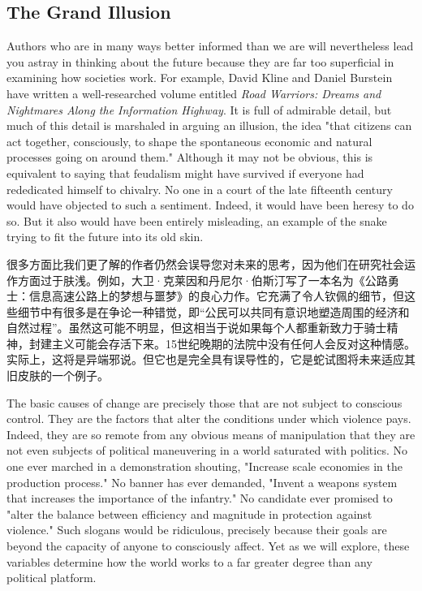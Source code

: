 \subsection{The Grand Illusion}
\begin{paracol}{2}  
Authors who are in many ways better informed than we are will nevertheless lead you astray in thinking about the future because they are far too superficial in examining how societies work. For example, David Kline and Daniel Burstein have written a well-researched volume entitled \emph{Road Warriors: Dreams and Nightmares Along the Information Highway}. It is full of admirable detail, but much of this detail is marshaled in arguing an illusion, the idea "that citizens can act together, consciously, to shape the spontaneous economic and natural processes going on around them." Although it may not be obvious, this is equivalent to saying that feudalism might have survived if everyone had rededicated himself to chivalry. No one in a court of the late fifteenth century would have objected to such a sentiment. Indeed, it would have been heresy to do so. But it also would have been entirely misleading, an example of the snake trying to fit the future into its old skin.

\switchcolumn
很多方面比我们更了解的作者仍然会误导您对未来的思考，因为他们在研究社会运作方面过于肤浅。例如，大卫·克莱因和丹尼尔·伯斯汀写了一本名为《公路勇士：信息高速公路上的梦想与噩梦》的良心力作。它充满了令人钦佩的细节，但这些细节中有很多是在争论一种错觉，即“公民可以共同有意识地塑造周围的经济和自然过程”。虽然这可能不明显，但这相当于说如果每个人都重新致力于骑士精神，封建主义可能会存活下来。15世纪晚期的法院中没有任何人会反对这种情感。实际上，这将是异端邪说。但它也是完全具有误导性的，它是蛇试图将未来适应其旧皮肤的一个例子。

\switchcolumn*
The basic causes of change are precisely those that are not subject to conscious control. They are the factors that alter the conditions under which violence pays. Indeed, they are so remote from any obvious means of manipulation that they are not even subjects of political maneuvering in a world saturated with politics. No one ever marched in a demonstration shouting, "Increase scale economies in the production process." No banner has ever demanded, "Invent a weapons system that increases the importance of the infantry." No candidate ever promised to "alter the balance between efficiency and magnitude in protection against violence." Such slogans would be ridiculous, precisely because their goals are beyond the capacity of anyone to consciously affect. Yet as we will explore, these variables determine how the world works to a far greater degree than any political platform.    


\end{paracol}
